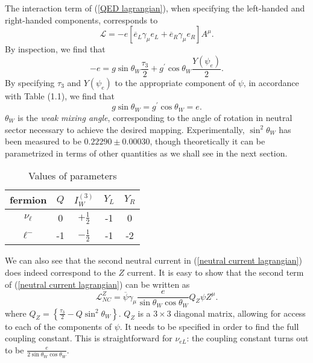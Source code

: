 \documentclass[10pt,a4paper]{book}
\begin{document}
The interaction term of (\ref{QED lagrangian}), when specifying the left-handed and right-handed components, corresponds to
\begin{equation}
\mathcal{L} = -e\left[ \overline{e}_L\gamma_\mu e_L + \overline{e}_R\gamma_\mu e_R
\right]A^\mu.
\end{equation} 
By inspection, we find that
\begin{equation}
-e = g\sin\theta_W \frac{\tau_3}{2} + g^\prime \cos\theta_W \frac{Y(\psi_{e})}{2}.
\end{equation}
By specifying $\tau_3$ and $Y(\psi_e)$ to the appropriate component of $\psi$, in accordance with Table (1.1), we find that
\begin{equation}
g\sin\theta_W = g^\prime \cos\theta_W = e.
\end{equation}
$\theta_W$ is the \emph{weak mixing angle}, corresponding to the angle of rotation in neutral sector necessary to achieve the desired mapping. Experimentally, $\sin^2\theta_W$ has been measured to be $0.22290 \pm 0.00030$, though theoretically it can be parametrized in terms of other quantities as we shall see in the next section.


\begin{table} 
\begin{center}
\begin{tabular}{ccccc}
\hline 
fermion & $Q$ & $I^{(3)}_W$ & $Y_L$ & $Y_R$ \\ 
\hline 
$\nu_\ell$ & 0 & $+\frac{1}{2}$ & -1 & 0 \\ 
$\ell^-$ & -1 & $-\frac{1}{2}$ & -1 & -2 \\ 
\end{tabular}
\caption{Values of parameters}
\end{center}
\end{table}

We can also see that the second neutral current in (\ref{neutral current lagrangian}) does indeed correspond to the $Z$ current. It is easy to show that the second term of (\ref{neutral current lagrangian}) can be written as
\begin{equation}
\label{NC - Z}
\mathcal{L}_{NC}^{Z} = \overline{\psi}\gamma_\mu \frac{e}{\sin\theta_W \cos\theta_W} Q_Z \psi Z^\mu.
\end{equation}
where $Q_Z = \left\lbrace \frac{\tau_3}{2} - Q\sin^2\theta_W \right\rbrace$. $Q_Z$ is a $3\times 3$ diagonal matrix, allowing for access to each of the components of $\psi$. It needs to be specified in order to find the full coupling constant. This is straightforward for $\nu_{eL}$: the coupling constant turns out to be $\frac{e}{2\sin\theta_W\cos\theta_W}$. 
\end{document}
